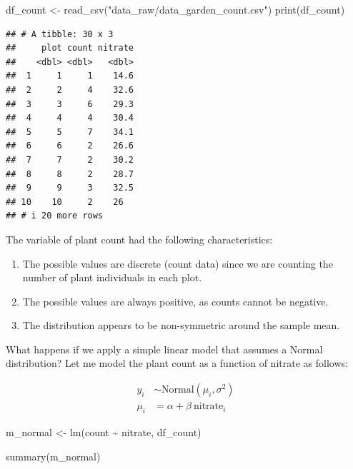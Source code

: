 \documentclass[
]{book}
\newenvironment{Shaded}{\begin{snugshade}}{\end{snugshade}}
\newcommand{\FunctionTok}[1]{\textcolor[rgb]{0.00,0.00,0.00}{#1}}
\newcommand{\NormalTok}[1]{#1}
\newcommand{\OtherTok}[1]{\textcolor[rgb]{0.56,0.35,0.01}{#1}}
\newcommand{\SpecialCharTok}[1]{\textcolor[rgb]{0.00,0.00,0.00}{#1}}
\newcommand{\StringTok}[1]{\textcolor[rgb]{0.31,0.60,0.02}{#1}}
\begin{document}
\begin{Shaded}
\begin{Highlighting}[]
\NormalTok{df\_count }\OtherTok{\textless{}{-}} \FunctionTok{read\_csv}\NormalTok{(}\StringTok{"data\_raw/data\_garden\_count.csv"}\NormalTok{)}
\FunctionTok{print}\NormalTok{(df\_count)}
\end{Highlighting}
\end{Shaded}

\begin{verbatim}
## # A tibble: 30 x 3
##     plot count nitrate
##    <dbl> <dbl>   <dbl>
##  1     1     1    14.6
##  2     2     4    32.6
##  3     3     6    29.3
##  4     4     4    30.4
##  5     5     7    34.1
##  6     6     2    26.6
##  7     7     2    30.2
##  8     8     2    28.7
##  9     9     3    32.5
## 10    10     2    26  
## # i 20 more rows
\end{verbatim}

The variable of plant count had the following characteristics:

\begin{enumerate}
\def\labelenumi{\arabic{enumi}.}
\item
  The possible values are discrete (count data) since we are counting the number of plant individuals in each plot.
\item
  The possible values are always positive, as counts cannot be negative.
\item
  The distribution appears to be non-symmetric around the sample mean.
\end{enumerate}

What happens if we apply a simple linear model that assumes a Normal distribution? Let me model the plant count as a function of nitrate as follows:

\[
\begin{aligned}
y_i &\sim \text{Normal}(\mu_i, \sigma^2)\\
\mu_i &= \alpha + \beta~\text{nitrate}_i
\end{aligned}
\]

\begin{Shaded}
\begin{Highlighting}[]
\NormalTok{m\_normal }\OtherTok{\textless{}{-}} \FunctionTok{lm}\NormalTok{(count }\SpecialCharTok{\textasciitilde{}}\NormalTok{ nitrate,}
\NormalTok{               df\_count)}

\FunctionTok{summary}\NormalTok{(m\_normal)}
\end{Highlighting}
\end{Shaded}
\end{document}
